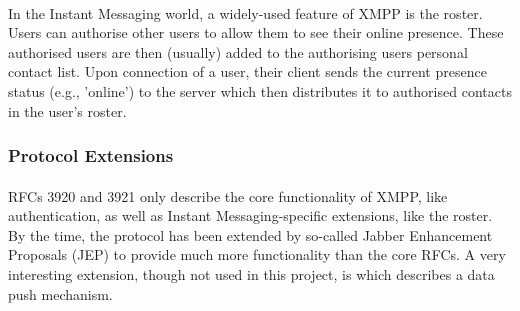 \paragraph{}
In the Instant Messaging world, a widely-used feature of XMPP is the roster. Users can authorise other users to allow them to see their online presence. These authorised users are then (usually) added to the authorising users personal contact list. Upon connection of a user, their client sends the current presence status (e.g., 'online') to the server which then distributes it to authorised contacts in the user's roster.

\subsubsection{Protocol Extensions}
\paragraph{}
RFCs 3920 and 3921 only describe the core functionality of XMPP, like authentication, as well as Instant Messaging-specific extensions, like the roster. By the time, the protocol has been extended by so-called Jabber Enhancement Proposals (JEP) to provide much more functionality than the core RFCs. A very interesting extension, though not used in this project, is \cite{jep0060} which describes a data push mechanism.
